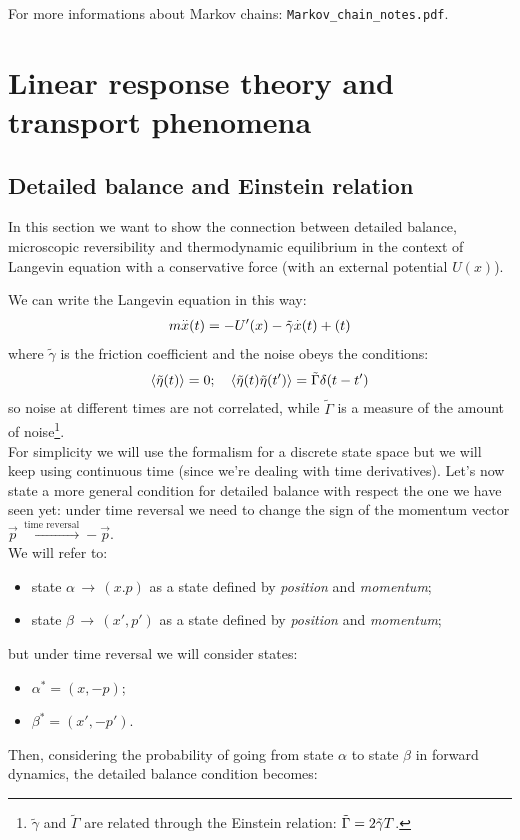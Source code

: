 \documentclass[\main/main.tex]{subfiles}
\begin{document}
For more informations about Markov chains: \texttt{Markov\_chain\_notes.pdf}.

\chapter{Linear response theory and transport phenomena}
\section{Detailed balance and Einstein relation}
In this section we want to show the connection between detailed balance, microscopic reversibility and thermodynamic equilibrium in the context of Langevin equation with a conservative force (with an external potential $U(x)$).

We can write the Langevin equation in this way:
\begin{eqnarray}
m \overset{..}{x}(t)=-U'(x)-\Tilde{\gamma}\overset{.}{x}(t)+\title{\eta}(t) 
\end{eqnarray}
where $\tilde{\gamma}$ is the friction coefficient and the noise obeys the conditions:
\begin{eqnarray}
\left\langle \Tilde{\eta}(t) \right\rangle=0; \quad \left\langle \Tilde{\eta}(t)\Tilde{\eta}(t') \right\rangle=\Tilde{\Gamma}\delta(t-t')
\end{eqnarray}
so noise at different times are not correlated, while $\tilde{\Gamma}$ is a measure of the amount of noise\footnote{$\tilde{\gamma}$ and $\tilde{\Gamma}$ are related through the Einstein relation: $\Tilde{\Gamma}=2\tilde{\gamma }T$.}. \\

For simplicity we will use the formalism for a discrete state space but we will keep using continuous time (since we're dealing with time derivatives). Let's now state a more general condition for detailed balance with respect the one we have seen yet: under time reversal we need to change the sign of the momentum vector $\Vec{p}\,\overset{\text{time reversal}}{\longrightarrow} -\Vec{p}$. \\

We will refer to:
\begin{itemize}
    \item state $\alpha \, \to \, (x.p)$ as a state defined by \textit{position} and \textit{momentum};
    \item state $\beta \, \to \, (x',p')$ as a state defined by \textit{position} and \textit{momentum};
\end{itemize}
but under time reversal we will consider states:
\begin{itemize}
    \item $\alpha^* = (x,-p)$;
    \item $\beta^* = (x',-p')$.
\end{itemize}
Then, considering the probability of going from state $\alpha$ to state $\beta$ in forward dynamics, the detailed balance condition becomes:
\end{document}
